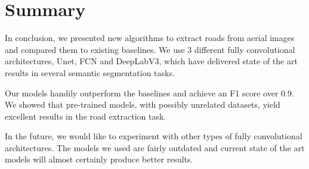 \section{Summary}
In conclusion, we presented new algorithms to extract roads from aerial images and compared them to existing baselines. We use 3 different fully convolutional architectures, Unet, FCN and DeepLabV3, which have delivered state of the art results in several semantic segmentation tasks.

Our models handily outperform the baselines and achieve an F1 score over 0.9. We showed that pre-trained models, with possibly unrelated datasets, yield excellent results in the road extraction task.

In the future, we would like to experiment with other types of fully convolutional architectures. The models we used are fairly outdated and current state of the art models will almost certainly produce better results.

